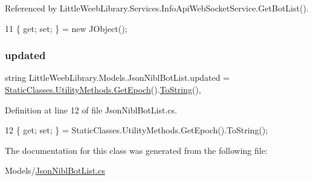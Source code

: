 Referenced by Little\+Weeb\+Library.\+Services.\+Info\+Api\+Web\+Socket\+Service.\+Get\+Bot\+List().


\begin{DoxyCode}
11 \{ \textcolor{keyword}{get}; \textcolor{keyword}{set}; \} = \textcolor{keyword}{new} JObject();
\end{DoxyCode}
\mbox{\label{class_little_weeb_library_1_1_models_1_1_json_nibl_bot_list_a847e10383522c3a7e8de785080690b07}} 
\subsubsection{\texorpdfstring{updated}{updated}}
{\footnotesize\ttfamily string Little\+Weeb\+Library.\+Models.\+Json\+Nibl\+Bot\+List.\+updated = \mbox{\hyperlink{class_little_weeb_library_1_1_static_classes_1_1_utility_methods_a12336d9e64983ddabaad8950486fafb2}{Static\+Classes.\+Utility\+Methods.\+Get\+Epoch}}().\mbox{\hyperlink{class_little_weeb_library_1_1_models_1_1_json_nibl_bot_list_aff76def0d8bf7b2d2f3b985a0507d6a0}{To\+String}}()\hspace{0.3cm}{\ttfamily [get]}, {\ttfamily [set]}}



Definition at line 12 of file Json\+Nibl\+Bot\+List.\+cs.


\begin{DoxyCode}
12 \{ \textcolor{keyword}{get}; \textcolor{keyword}{set}; \} = StaticClasses.UtilityMethods.GetEpoch().ToString();
\end{DoxyCode}


The documentation for this class was generated from the following file\+:\begin{DoxyCompactItemize}
\item 
Models/\mbox{\hyperlink{_json_nibl_bot_list_8cs}{Json\+Nibl\+Bot\+List.\+cs}}\end{DoxyCompactItemize}
